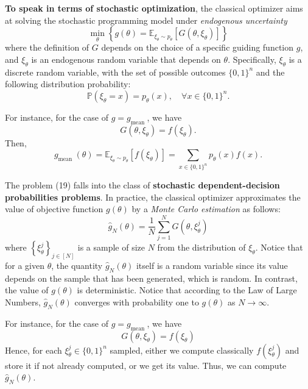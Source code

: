 \textbf{To speak in terms of stochastic optimization}, the classical optimizer aims at solving the stochastic programming model under \textit{endogenous uncertainty} 
\begin{equation*}
\min _{\theta}\left\{g(\theta)=\mathbb{E}_{\xi_{\theta} \sim p_{\theta}}\left[G\left(\theta, \xi_{\theta}\right)\right]\right\} \tag{19}
\end{equation*}
where the definition of $G$ depends on the choice of a specific guiding function $g$, and $\xi_{\theta}$ is an endogenous random variable that depends on $\theta$. Specifically, $\xi_{\theta}$ is a discrete random variable, with the set of possible outcomes $\{0,1\}^{n}$ and the following distribution probability:
$$
\mathbb{P}\left(\xi_{\theta}=x\right)=p_{\theta}(x), \quad \forall x \in\{0,1\}^{n}.
$$
\begin{example}
    For instance, for the case of $g=g_{\text {mean }}$, we have
$$
G\left(\theta, \xi_{\theta}\right)=f\left(\xi_{\theta}\right).
$$
Then, 
$$
g_{\text {mean }}(\theta)
=\mathbb{E}_{\xi_{\theta} \sim p_{\theta}}\left[f\left(\xi_{\theta}\right)\right]
=\sum_{x \in\{0,1\}^{n}} p_{\theta}(x) f(x).
$$
\end{example}


The problem (19) falls into the class of \textbf{stochastic dependent-decision probabilities problems}. %
In practice, the classical optimizer approximates the value of objective function $g(\theta)$ by a \textit{Monte Carlo estimation} as follows:
$$
\hat{g}_{N}(\theta)=\frac{1}{N} \sum_{j=1}^{N} G\left(\theta, \xi_{\theta}^{j}\right)
$$
where $\left\{\xi_{\theta}^{j}\right\}_{j \in[N]}$ is a sample of size $N$ from the distribution of $\xi_{\theta}$. Notice that for a given $\theta$, the quantity $\hat{g}_{N}(\theta)$ itself is a random variable since its value depends on the sample that has been generated, which is random. In contrast, the value of $g(\theta)$ is deterministic. Notice that according to the Law of Large Numbers, $\hat{g}_{N}(\theta)$ converges with probability one to $g(\theta)$ as $N \rightarrow \infty$.

\begin{example}
For instance, for the case of $g=g_{\text {mean }}$, we have
$$
G\left(\theta, \xi_{\theta}\right)=f\left(\xi_{\theta}\right)
$$
Hence, for each $\xi_{\theta}^{j} \in\{0,1\}^{n}$ sampled, either we compute classically $f(\xi_{\theta}^{j})$ and store it if not already computed, or we get its value. Thus, we can compute $\hat{g}_{N}(\theta)$. 
\end{example}


